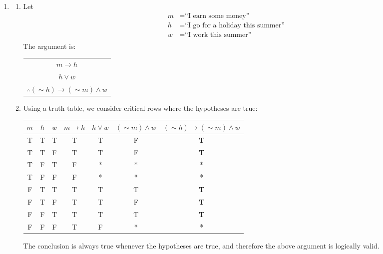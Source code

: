 
\begin{enumerate}
\item
    \begin{enumerate}
    \item Let
        \begin{align*}
            m &= \textrm{``I earn some money''} \\
            h &= \textrm{``I go for a holiday this summer''} \\
            w &= \textrm{``I work this summer''} \\
        \end{align*}
        The argument is:

        \begin{tabular}{c}
            $m \rightarrow h$ \\
            $h \vee w$ \\
            \hline
            $\therefore (\sim h) \rightarrow (\sim m) \wedge w$ \\
        \end{tabular}

    \item
        Using a truth table, we consider critical rows where the
        hypotheses are true:

        \begin{tabular}{c|c|c|c|c|c|c}
        $m$ & $h$ & $w$ & $m \rightarrow h$ & $h \vee w$ &
            $(\sim m) \wedge w$ &
            $(\sim h) \rightarrow (\sim m) \wedge w$ \\
        \hline
        T & T & T & T & T & F & \textbf{T} \\
        T & T & F & T & T & F & \textbf{T} \\
        T & F & T & F & * & * & * \\
        T & F & F & F & * & * & * \\
        F & T & T & T & T & T & \textbf{T} \\
        F & T & F & T & T & F & \textbf{T} \\
        F & F & T & T & T & T & \textbf{T} \\
        F & F & F & T & F & * & * \\
        \end{tabular}

        The conclusion is always true whenever the hypotheses are true,
        and therefore the above argument is logically valid.
    \end{enumerate}


\end{enumerate}
